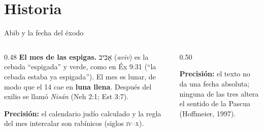 \documentclass[hyperref={bookmarks=false},aspectratio=169]{beamer}
\newcommand{\heb}[1]{\mbox{\foreignlanguage{hebrew}{#1}}}
\newcommand{\destacar}[1]{\textbf{\textcolor{tierraroja}{#1}}}
\newcommand{\precision}[1]{{\footnotesize\color{sepia}\textbf{Precisión:} #1}}
\begin{document}
\section{Historia}

\begin{frame}{Abib y la fecha del éxodo}
\begin{columns}[t,onlytextwidth]
\begin{column}{0.48\textwidth}\small\RaggedRight
\textbf{\textcolor{tierraroja}{El mes de las espigas.}} \heb{אָבִיב} (\emph{aviv}) es la cebada ``espigada'' y verde, como en Éx 9:31 (``la cebada estaba ya espigada''). El mes es lunar, de modo que el 14 cae en \destacar{luna llena}. Después del exilio se llamó \emph{Nisán} (Neh 2:1; Est 3:7).\par\smallskip
\precision{el calendario judío calculado y la regla del mes intercalar son rabínicos (siglos \textsc{iv}--\textsc{x}).}
\end{column}
\begin{column}{0.50\textwidth}
\centering
{}\par\smallskip
\precision{el texto no da una fecha absoluta; ninguna de las tres altera el sentido de la Pascua (Hoffmeier, 1997).}
\end{column}
\end{columns}
\end{frame}
\end{document}
